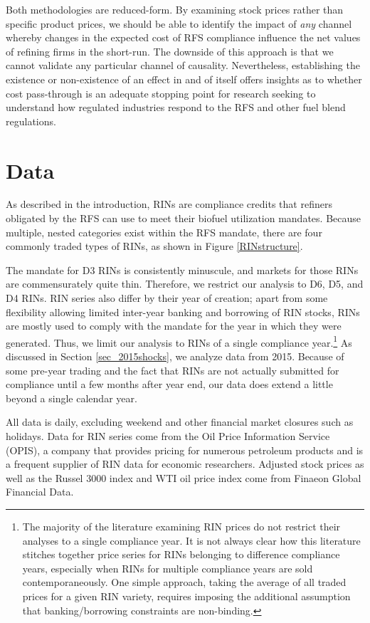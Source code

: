 \documentclass[11pt]{article}
\begin{document}
Both methodologies are reduced-form. By examining stock prices rather than specific product prices, we should be able to identify the impact of \textit{any} channel whereby changes in the expected cost of RFS compliance influence the net values of refining firms in the short-run. The downside of this approach is that we cannot validate any particular channel of causality. Nevertheless, establishing the existence or non-existence of an effect in and of itself offers insights as to whether cost pass-through is an adequate stopping point for research seeking to understand how regulated industries respond to the RFS and other fuel blend regulations.

\section{Data}

As described in the introduction, RINs are compliance credits that refiners obligated by the RFS can use to meet their biofuel utilization mandates. Because multiple, nested categories exist within the RFS mandate, there are four commonly traded types of RINs, as shown in Figure \ref{RINstructure}.

The mandate for D3 RINs is consistently minuscule, and markets for those RINs are commensurately quite thin. Therefore, we restrict our analysis to D6, D5, and D4 RINs. RIN series also differ by their year of creation; apart from some flexibility allowing limited inter-year banking and borrowing of RIN stocks, RINs are mostly used to comply with the mandate for the year in which they were generated. Thus, we limit our analysis to RINs of a single compliance year.\footnote{The majority of the literature examining RIN prices do not restrict their analyses to a single compliance year. It is not always clear how this literature stitches together price series for RINs belonging to difference compliance years, especially when RINs for multiple compliance years are sold contemporaneously. One simple approach, taking the average of all traded prices for a given RIN variety, requires imposing the additional assumption that banking/borrowing constraints are non-binding.} As discussed in Section \ref{sec_2015shocks}, we analyze data from 2015. Because of some pre-year trading and the fact that RINs are not actually submitted for compliance until a few months after year end, our data does extend a little beyond a single calendar year. 

All data is daily, excluding weekend and other financial market closures such as holidays. Data for RIN series come from the Oil Price Information Service (OPIS), a company that provides pricing for numerous petroleum products and is a frequent supplier of RIN data for economic researchers. Adjusted stock prices as well as the Russel 3000 index and WTI oil price index come from Finaeon Global Financial Data.
\end{document}
